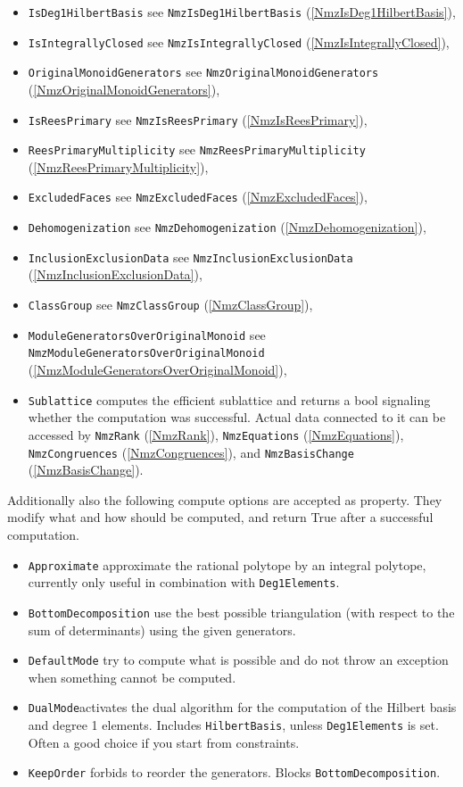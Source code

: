 \documentclass[a4paper,11pt]{report}
\begin{document}
{{{\begin{itemize}
\item \texttt{IsDeg1HilbertBasis} see \texttt{NmzIsDeg1HilbertBasis} (\ref{NmzIsDeg1HilbertBasis}),
\item \texttt{IsIntegrallyClosed} see \texttt{NmzIsIntegrallyClosed} (\ref{NmzIsIntegrallyClosed}),
\item \texttt{OriginalMonoidGenerators} see \texttt{NmzOriginalMonoidGenerators} (\ref{NmzOriginalMonoidGenerators}),
\item \texttt{IsReesPrimary} see \texttt{NmzIsReesPrimary} (\ref{NmzIsReesPrimary}),
\item \texttt{ReesPrimaryMultiplicity} see \texttt{NmzReesPrimaryMultiplicity} (\ref{NmzReesPrimaryMultiplicity}),
\item \texttt{ExcludedFaces} see \texttt{NmzExcludedFaces} (\ref{NmzExcludedFaces}),
\item \texttt{Dehomogenization} see \texttt{NmzDehomogenization} (\ref{NmzDehomogenization}),
\item \texttt{InclusionExclusionData} see \texttt{NmzInclusionExclusionData} (\ref{NmzInclusionExclusionData}),
\item \texttt{ClassGroup} see \texttt{NmzClassGroup} (\ref{NmzClassGroup}),
\item \texttt{ModuleGeneratorsOverOriginalMonoid} see \texttt{NmzModuleGeneratorsOverOriginalMonoid} (\ref{NmzModuleGeneratorsOverOriginalMonoid}),
\item \texttt{Sublattice} computes the efficient sublattice and returns a bool signaling whether the
computation was successful. Actual data connected to it can be accessed by \texttt{NmzRank} (\ref{NmzRank}), \texttt{NmzEquations} (\ref{NmzEquations}), \texttt{NmzCongruences} (\ref{NmzCongruences}), and \texttt{NmzBasisChange} (\ref{NmzBasisChange}).
\end{itemize}
 

 Additionally also the following compute options are accepted as property. They
modify what and how should be computed, and return True after a successful
computation. 
\begin{itemize}
\item \texttt{Approximate} approximate the rational polytope by an integral polytope, currently only
useful in combination with \texttt{Deg1Elements}.
\item \texttt{BottomDecomposition} use the best possible triangulation (with respect to the sum of determinants)
using the given generators.
\item \texttt{DefaultMode} try to compute what is possible and do not throw an exception when something
cannot be computed.
\item \texttt{DualMode}activates the dual algorithm for the computation of the Hilbert basis and
degree 1 elements. Includes \texttt{HilbertBasis}, unless \texttt{Deg1Elements} is set. Often a good choice if you start from constraints.
\item \texttt{KeepOrder} forbids to reorder the generators. Blocks \texttt{BottomDecomposition}.
\end{itemize}
 

}}}
\end{document}
